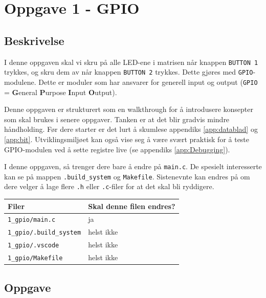 \section{Oppgave 1 - GPIO}\label{sec:3-oppgave-GPIO}


\subsection{Beskrivelse}



I denne oppgaven skal vi skru på alle LED-ene i matrisen når knappen \verb|BUTTON 1| trykkes, og skru dem av når knappen \verb|BUTTON 2| trykkes. Dette gjøres med \verb|GPIO|-modulene. Dette er moduler som har ansvarer for generell input og output (\verb|GPIO| = \textbf{G}eneral \textbf{P}urpose \textbf{I}nput \textbf{O}utput).

Denne oppgaven er strukturert som en walkthrough for å introdusere konsepter som skal brukes i senere oppgaver. Tanken er at det blir gradvis mindre håndholding. Før dere starter er det lurt å skumlese appendiks \ref{app:datablad} og \ref{app:bit}. Utviklingsmiljøet kan også vise seg å være svært praktisk for å teste GPIO-modulen ved å sette registre live (se appendiks \ref{app:Debugging}).

I denne oppgaven, så trenger dere bare å endre på \verb|main.c|. De spesielt interesserte kan se på mappen \verb|.build_system| og \verb|Makefile|. Sistenevnte kan endres på om dere velger å lage flere \verb|.h| eller \verb|.c|-filer for at det skal bli ryddigere.

\begin{center}
 \begin{tabular}{|p{8.5cm} p{5.5cm}|} 
 \hline
 Filer & Skal denne filen endres?  \\ [0.5ex] 
 \hline\hline
 \verb|1_gpio/main.c| & \quad \quad \quad \quad ja  \\ 
 \hline
  \verb|1_gpio/.build_system| &  \quad \quad \quad \quad helst ikke \\ 
 \hline
 \verb|1_gpio/.vscode| &  \quad \quad \quad \quad helst ikke \\ 
 \hline
 \verb|1_gpio/Makefile| &  \quad \quad \quad \quad helst ikke \\ 
 \hline
\end{tabular}
\end{center}


\subsection{Oppgave}

